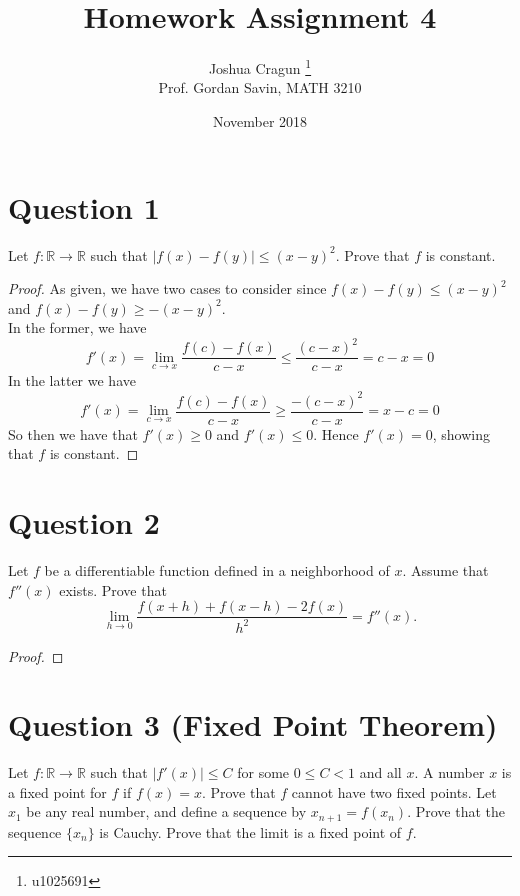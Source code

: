 \documentclass[12pt, letterpaper]{article}
\title{Homework Assignment 4}
\author{Joshua Cragun \thanks{u1025691} \\ Prof. Gordan Savin, MATH 3210}
\date{November 2018}
\begin{document}
\begin{titlepage}
\maketitle
\end{titlepage}

\section*{Question 1}
Let $f: \mathbb R \rightarrow \mathbb R$ such that $|f(x)-f(y)| \leq (x-y)^2$. Prove that $f$ is constant.

\begin{proof}
  As given, we have two cases to consider since $f(x)-f(y) \leq (x-y)^2$ and $f(x)-f(y) \geq -(x-y)^2$.\\

  \noindent In the former, we have
  $$ f'(x) = \lim_{c \to x} \frac{f(c) - f(x)}{c - x} \leq \frac{(c-x)^2}{c-x} = c-x = 0$$
  \noindent In the latter we have
  $$ f'(x) = \lim_{c \to x} \frac{f(c) - f(x)}{c - x} \geq \frac{-(c-x)^2}{c-x} = x-c = 0$$
  So then we have that $f'(x) \geq 0$ and $f'(x) \leq 0$. Hence $f'(x) = 0$, showing that $f$ is constant.
\end{proof}

\section*{Question 2}
Let $f$ be a differentiable function defined in a neighborhood of $x$. Assume  that $f''(x)$ exists. Prove that
\[
\lim_{h\rightarrow 0} \frac{f(x+h) + f(x-h) -2 f(x)}{h^2} = f''(x).
\]

\begin{proof}

\end{proof}
\section*{Question 3 (Fixed Point Theorem)}
Let $f: \mathbb R \rightarrow \mathbb R$ such that $|f'(x)| \leq C$ for some $0\leq C< 1$ and all $x$.  A number $x$ is a fixed point for $f$ if
$f(x)=x$. Prove that $f$ cannot have two fixed points.
Let $x_1$ be any real number, and define
a sequence by $x_{n+1}=f(x_n)$. Prove that the sequence $\{x_n\}$ is Cauchy. Prove that the limit is a fixed
point of $f$. \\
\end{document}
